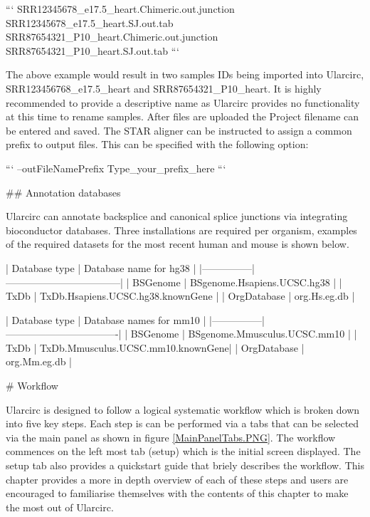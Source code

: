 ```
SRR12345678_e17.5_heart.Chimeric.out.junction
SRR12345678_e17.5_heart.SJ.out.tab
SRR87654321_P10_heart.Chimeric.out.junction
SRR87654321_P10_heart.SJ.out.tab
```


The above example would result in two samples IDs being imported into Ularcirc, SRR123456768_e17.5_heart and SRR87654321_P10_heart. It is highly recommended to provide a descriptive name as Ularcirc provides no functionality at this time to rename samples. After files are uploaded the Project filename can be entered and saved. The STAR aligner can be instructed to assign a common prefix to output files. This can be specified with the following option:

```
--outFileNamePrefix Type_your_prefix_here
```

## Annotation databases

Ularcirc can annotate backsplice and canonical splice junctions via integrating bioconductor databases. Three installations are required per organism, examples of the required datasets for the most recent human and mouse is shown below.



| Database type | Database name for hg38            |
|---------------|-----------------------------------|
| BSGenome      | BSgenome.Hsapiens.UCSC.hg38       |
| TxDb          | TxDb.Hsapiens.UCSC.hg38.knownGene |
| OrgDatabase   | org.Hs.eg.db                      |



| Database type | Database names for mm10           |
|---------------| ----------------------------------|
| BSGenome      | BSgenome.Mmusculus.UCSC.mm10      |
| TxDb          | TxDb.Mmusculus.UCSC.mm10.knownGene|
| OrgDatabase   | org.Mm.eg.db                      |


# Workflow

Ularcirc is designed to follow a logical systematic workflow which is broken down into five key steps. Each step is can be performed  via a tabs that can be selected via the main panel as shown in figure \ref{MainPanelTabs.PNG}. The workflow commences on the left most tab (setup) which is  the initial screen displayed. The setup tab also  provides a quickstart guide that briely describes the workflow. This chapter provides a more in depth overview of each of these steps and users are encouraged to familiarise themselves with the contents of this chapter to make the most out of Ularcirc.


